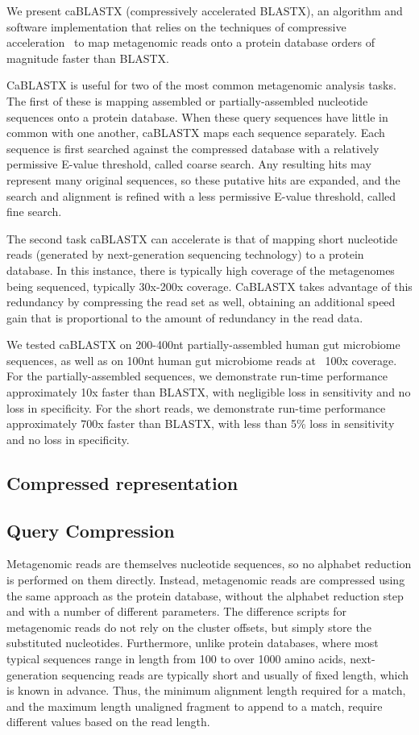 \documentclass{amsbook}
\theoremstyle{definition}
\theoremstyle{remark}
\numberwithin{equation}{section}
\begin{document}
We present caBLASTX (compressively accelerated BLASTX), an algorithm and 
software implementation that relies on the techniques of compressive 
acceleration~\cite{Loh, Daniels} to map metagenomic reads onto a protein 
database orders of magnitude faster than BLASTX.

CaBLASTX is useful for two of the most common metagenomic analysis tasks. 
The first of these is mapping assembled or partially-assembled
nucleotide sequences onto a protein database. 
When these query sequences have
little in common with one another, caBLASTX maps each sequence separately. 
Each sequence is first searched against the compressed database with a 
relatively permissive E-value threshold, called coarse search. 
Any resulting hits may represent many original sequences, so these putative 
hits are expanded, and the search and alignment is refined with a less 
permissive E-value threshold, called fine search.

The second task caBLASTX can accelerate is that of mapping short nucleotide
reads (generated by next-generation sequencing technology) to a protein
database. In this instance, there is typically high coverage of the metagenomes
being sequenced, typically 30x-200x coverage. CaBLASTX takes advantage of this
redundancy
by compressing the read set as well, obtaining an additional speed gain that is
proportional to the amount of redundancy in the read data.


We tested caBLASTX on 200-400nt partially-assembled human gut microbiome
sequences, as well as on 100nt human gut microbiome reads at ~100x coverage.
For the partially-assembled sequences, we demonstrate run-time performance
approximately 10x faster than BLASTX, with negligible loss in sensitivity and
no loss in specificity. For the short reads, we demonstrate run-time
performance approximately 700x faster than BLASTX, with less than 5\% loss in
sensitivity and no loss in specificity.

\subsection*{Compressed representation}



\subsection*{Query Compression}

Metagenomic reads are themselves nucleotide sequences, so no alphabet reduction
is performed on them directly.
Instead, metagenomic reads are compressed using the same approach as the
protein database, without the alphabet reduction step and with a number of
different parameters.
The difference scripts for metagenomic reads do not rely on the cluster offsets,
but simply store the substituted nucleotides.
Furthermore, unlike protein databases, where most typical sequences range in 
length from 100 to over 1000 amino acids, next-generation sequencing reads are 
typically short and usually of fixed length, which is known in advance.
Thus, the minimum alignment length required for a match, and the maximum
length unaligned fragment to append to a match, require different values based
on the read length.
\end{document}
